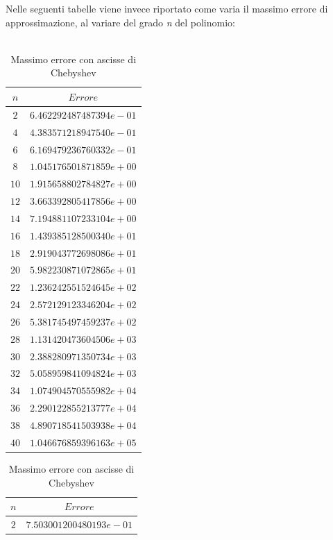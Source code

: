 Nelle seguenti tabelle viene invece riportato come varia il massimo errore di approssimazione, al variare del grado \textit{n} del polinomio:\\\
\begin{table}[H]
	\begin{minipage}{0.5\textwidth}
		\centering
		\caption{Massimo errore con ascisse equispaziate}
		\begin{tabular}{|c|c|}
			\hline
			$n$ & $Errore$ \\
			\hline
			$2$  & $6.462292487487394e-01$ \\
			$4$  & $4.383571218947540e-01$ \\
			$6$  & $6.169479236760332e-01$ \\
			$8$  & $1.045176501871859e+00$ \\
			$10$ & $1.915658802784827e+00$ \\
			$12$ & $3.663392805417856e+00$ \\
			$14$ & $7.194881107233104e+00$ \\
			$16$ & $1.439385128500340e+01$ \\
			$18$ & $2.919043772698086e+01$ \\
			$20$ & $5.982230871072865e+01$ \\
			$22$ & $1.236242551524645e+02$ \\
			$24$ & $2.572129123346204e+02$ \\
			$26$ & $5.381745497459237e+02$ \\
			$28$ & $1.131420473604506e+03$ \\
			$30$ & $2.388280971350734e+03$ \\
			$32$ & $5.058959841094824e+03$ \\
			$34$ & $1.074904570555982e+04$ \\
			$36$ & $2.290122855213777e+04$ \\
			$38$ & $4.890718541503938e+04$ \\
			$40$ & $1.046676859396163e+05$ \\
			\hline
		\end{tabular}
	\end{minipage}
	\hspace*{\fill}
	\begin{minipage}{0.5\textwidth}
		\centering
		\caption{Massimo errore con ascisse di Chebyshev}
		\begin{tabular}{|c|c|}
			\hline
			$n$ & $Errore$ \\
			\hline
			$2$  & $7.503001200480193e-01$ \\

\end{tabular}
\end{minipage}
\end{table}

